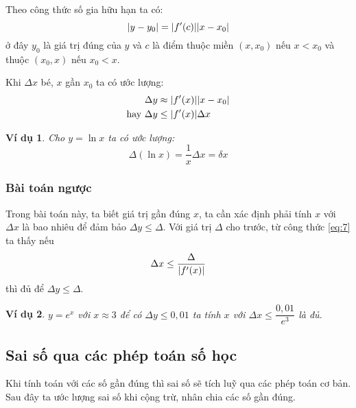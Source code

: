 \documentclass{book}    %
\DeclarePairedDelimiter\abs{\lvert}{\rvert}%
\newtheorem{exmp}{Ví dụ}[chapter]
\begin{document}
Theo công thức số gia hữu hạn ta có:
\begin{equation*}
    \abs{y - y_0} = \abs{f'(c)}\abs{x - x_0}
\end{equation*}
ở đây \(y_0\) là giá trị đúng của \(y\) và \(c\) là điểm thuộc miền \((x, x_0)\)
nếu \(x < x_0\) và thuộc \((x_0, x)\) nếu \(x_0 < x\).

Khi \(\Delta x\) bé, \(x\) gần \(x_0\) ta có ước lượng:
\begin{equation} \label{eq:7}
    \begin{aligned}
                    &\Delta y \approx \abs{f'(x)}\abs{x - x_0} \\
        \text{hay } &\Delta y \leq \abs{f'(x)}\Delta x
    \end{aligned}
\end{equation}

\begin{exmp}
    Cho \(y = \ln{x}\) ta có ước lượng:
    \begin{equation}
        \Delta(\ln{x}) = \frac{1}{x} \Delta x = \delta x
    \end{equation}
\end{exmp}

\subsubsection{Bài toán ngược}

Trong bài toán này, ta biết giá trị gần đúng \(x\), ta cần xác định phải tính
\(x\) với \(\Delta x\) là bao nhiêu để đảm bảo \(\Delta y \leq \Delta\). Với giá
trị \(\Delta\) cho trước, từ công thức \ref{eq:7} ta thấy nếu
\begin{equation} \label{eq:approx_of_relative_error}
    \Delta x \leq \frac{\Delta}{\abs{f'(x)}}
\end{equation}
thì đủ để \(\Delta y \leq \Delta\).

\begin{exmp}
    \(y = e^x\) với \(x \approx 3\) để có \(\Delta y \leq 0,01\) ta tính \(x\)
    với \(\Delta x \leq \dfrac{0,01}{e^3}\) là đủ.
\end{exmp}

\subsection{Sai số qua các phép toán số học}

Khi tính toán với các số gần đúng thì sai số sẽ tích luỹ qua các phép toán cơ
bản. Sau đây ta ước lượng sai số khi cộng trừ, nhân chia các số gần đúng.
\end{document}
